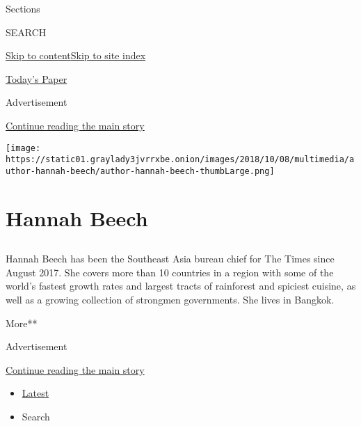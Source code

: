 Sections

SEARCH

\protect\hyperlink{site-content}{Skip to
content}\protect\hyperlink{site-index}{Skip to site index}

\href{https://myaccount.nytimes3xbfgragh.onion/auth/login?response_type=cookie\&client_id=vi}{}

\href{https://www.nytimes3xbfgragh.onion/section/todayspaper}{Today's
Paper}

Advertisement

\protect\hyperlink{after-top}{Continue reading the main story}

\texttt{[image: https://static01.graylady3jvrrxbe.onion/images/2018/10/08/multimedia/author-hannah-beech/author-hannah-beech-thumbLarge.png]}

\hypertarget{hannah-beech}{%
\section{Hannah Beech}\label{hannah-beech}}

\subsection{}

Hannah Beech has been the Southeast Asia bureau chief for The Times
since August 2017. She covers more than 10 countries in a region with
some of the world's fastest growth rates and largest tracts of
rainforest and spiciest cuisine, as well as a growing collection of
strongmen governments. She lives in Bangkok.

More**

Advertisement

\protect\hyperlink{after-mid1}{Continue reading the main story}

\begin{itemize}
\tightlist
\item
  \protect\hyperlink{stream-panel}{Latest}
\item
  Search
\end{itemize}

